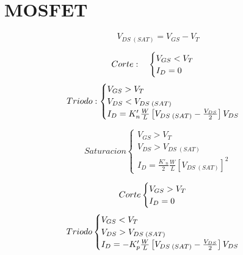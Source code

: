 \section{MOSFET}
\begin{equation}
    V_{DS\;(SAT)} = V_{GS} - V_T 
\end{equation}


\begin{equation*}
Corte: \quad \begin{cases}
    V_{GS} < V_T \\
    I_D = 0
\end{cases} \\
\end{equation*}
\begin{equation*}
  Triodo:\begin{cases}
    V_{GS} > V_T \\
    V_{DS} < V_{DS\;(SAT)} \\
    I_D = K'_n\frac{W}{L}\left[V_{DS\;(SAT)} - \frac{V_{DS}}{2}\right]V_{DS}
\end{cases} \\  
\end{equation*}

\begin{equation*}
    Saturacion\begin{cases}
    V_{GS} > V_T \\
    V_{DS} > V_{DS\;(SAT)} \\
    I_D = \frac{K'_n}{2}\frac{W}{L}\left[V_{DS\;(SAT)}\right]^2
\end{cases}
\end{equation*}


\begin{equation*}
    Corte\begin{cases}
    V_{GS} > V_T \\
    I_D = 0
\end{cases} \\
\end{equation*}
\begin{equation*}
    Triodo\begin{cases}
    V_{GS} < V_T \\
    V_{DS} > V_{DS\;(SAT)} \\
    I_D = -K'_p\frac{W}{L}\left[V_{DS\;(SAT)} - \frac{V_{DS}}{2}\right]V_{DS}
\end{cases} \\
\end{equation*}


